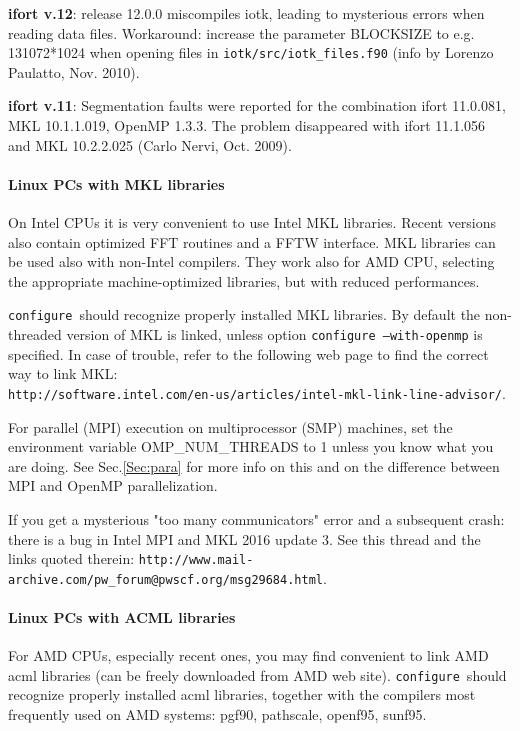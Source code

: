 \documentclass[12pt,a4paper]{article}
\def\configure{\texttt{configure}}
\begin{document}
{\bf ifort v.12}: release 12.0.0 miscompiles iotk, leading to
mysterious errors when reading data files. Workaround: increase
the parameter BLOCKSIZE to e.g. 131072*1024 when opening files in
\texttt{iotk/src/iotk\_files.f90} (info by Lorenzo Paulatto,
Nov. 2010). 

{\bf ifort v.11}: Segmentation faults were reported for the combination
ifort 11.0.081, MKL 10.1.1.019, OpenMP 1.3.3. The problem disappeared
with ifort 11.1.056 and MKL 10.2.2.025 (Carlo Nervi, Oct. 2009).

\paragraph{Linux PCs with MKL libraries}
On Intel CPUs it is very convenient to use Intel MKL libraries.
Recent versions also contain optimized FFT routines and a FFTW
interface. MKL libraries can be used also with non-Intel compilers.
They work also for AMD CPU, selecting the appropriate machine-optimized
libraries, but with reduced performances.

\configure\ should recognize properly installed MKL libraries.
By default the non-threaded version of MKL is linked, unless option
\texttt{configure --with-openmp} is specified. In case of trouble,
refer to the following web page to find the correct way to link MKL:\\
\texttt{http://software.intel.com/en-us/articles/intel-mkl-link-line-advisor/}.

For parallel (MPI) execution on multiprocessor (SMP) machines, set the
environment variable OMP\_NUM\_THREADS to 1 unless you know what you
are doing. See Sec.\ref{Sec:para} for more info on this
and on the difference between MPI and OpenMP parallelization.

If you get a mysterious "too many communicators" error and a 
subsequent crash: there is a bug in Intel MPI and MKL 2016 update 3.
See this thread and the links quoted therein:
\verb|http://www.mail-archive.com/pw_forum@pwscf.org/msg29684.html|.

\paragraph{Linux PCs with ACML libraries}
For AMD CPUs, especially recent ones, you may find convenient to
link AMD acml libraries (can be freely downloaded from AMD web site).
\configure\ should recognize properly installed acml libraries,
together with the compilers most frequently used on AMD systems:
pgf90, pathscale, openf95, sunf95.
\end{document}
